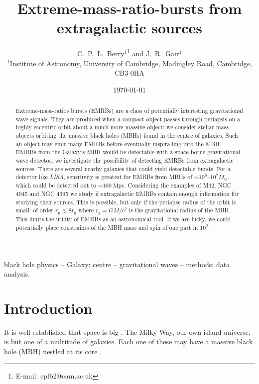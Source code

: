 \documentclass[useAMS,usedcolumn,usegraphicx,usenatbib]{mn2e}
\title[EMRBs from extragalactic sources]{Extreme-mass-ratio-bursts from extragalactic sources}
\author[C.\ P.\ L.\ Berry and J.\ R.\ Gair]{C.\ P.\ L.\ Berry$^{1}$\thanks{E-mail: cplb2@cam.ac.uk} and J.\ R.\ Gair$^{1}$\\
$^{1}$Institute of Astronomy, University of Cambridge, Madingley Road, Cambridge, CB3 0HA}
\newcommand{\units}[1]{\ensuremath{~\mathrm{#1}}}
\newcommand{\sub}[1]{\ensuremath{_\mathrm{#1}}}
\begin{document}
\date{\today}

\pagerange{\pageref{firstpage}--\pageref{lastpage}} 

\maketitle

\label{firstpage}

\begin{abstract}
Extreme-mass-ratios bursts (EMRBs) are a class of potentially interesting gravitational wave signals. They are produced when a compact object passes through periapsis on a highly eccentric orbit about a much more massive object; we consider stellar mass objects orbiting the massive black holes (MBHs) found in the centre of galaxies. Such an object may emit many EMRBs before eventually inspiralling into the MBH. EMRBs from the Galaxy's MBH would be detectable with a space-borne gravitational wave detector; we investigate the possibility of detecting EMRBs from extragalactic sources. There are several nearby galaxies that could yield detectable bursts. For a detector like \textit{LISA}, sensitivity is greatest for EMRBs from MBHs of $\sim10^6$--$10^7 M_\odot$, which could be detected out to $\sim 100\units{Mpc}$. Considering the examples of M32, NGC 4945 and NGC 4395 we study if extragalactic EMRBs contain enough information for studying their sources. This is possible, but only if the periapse radius of the orbit is small: of order $r\sub{p} \lesssim 8 r\sub{g}$ where $r\sub{g} = GM/c^2$ is the gravitational radius of the MBH. This limits the utility of EMRBs as an astronomical tool. If we are lucky, we could potentially place constraints of the MBH mass and spin of one part in $10^2$.
\end{abstract}

\begin{keywords}
black hole physics -- Galaxy: centre -- gravitational waves -- methods: data analysis.
\end{keywords}

\section{Introduction}\label{sec:Intro}

It is well established that space is big \citep[chapter 8]{Adams1979}. The Milky Way, our own island universe, is but one of a multitude of galaxies. Each one of these may have a massive black hole (MBH) nestled at its core \citep{Lynden-Bell1971, Soltan1982}.
\end{document}
